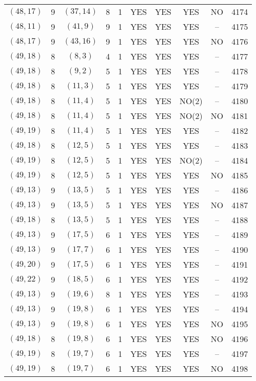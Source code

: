 \begin{longtable}{|c|c|c|c|c|c|c|c|c|c|}
$(48, 17)$ & 9 & $(37, 14)$ & 8 & 1 & YES & YES & YES & NO & 4174\\
$(48, 11)$ & 9 & $(41, 9)$ & 9 & 1 & YES & YES & YES & -- & 4175\\
$(48, 17)$ & 9 & $(43, 16)$ & 9 & 1 & YES & YES & YES & NO & 4176\\
$(49, 18)$ & 8 & $(8, 3)$ & 4 & 1 & YES & YES & YES & -- & 4177\\
$(49, 18)$ & 8 & $(9, 2)$ & 5 & 1 & YES & YES & YES & -- & 4178\\
$(49, 18)$ & 8 & $(11, 3)$ & 5 & 1 & YES & YES & YES & -- & 4179\\
$(49, 18)$ & 8 & $(11, 4)$ & 5 & 1 & YES & YES & NO(2) & -- & 4180\\
$(49, 18)$ & 8 & $(11, 4)$ & 5 & 1 & YES & YES & NO(2) & NO & 4181\\
$(49, 19)$ & 8 & $(11, 4)$ & 5 & 1 & YES & YES & YES & -- & 4182\\
$(49, 18)$ & 8 & $(12, 5)$ & 5 & 1 & YES & YES & YES & -- & 4183\\
$(49, 19)$ & 8 & $(12, 5)$ & 5 & 1 & YES & YES & NO(2) & -- & 4184\\
$(49, 19)$ & 8 & $(12, 5)$ & 5 & 1 & YES & YES & YES & NO & 4185\\
$(49, 13)$ & 9 & $(13, 5)$ & 5 & 1 & YES & YES & YES & -- & 4186\\
$(49, 13)$ & 9 & $(13, 5)$ & 5 & 1 & YES & YES & YES & NO & 4187\\
$(49, 18)$ & 8 & $(13, 5)$ & 5 & 1 & YES & YES & YES & -- & 4188\\
$(49, 13)$ & 9 & $(17, 5)$ & 6 & 1 & YES & YES & YES & -- & 4189\\
$(49, 13)$ & 9 & $(17, 7)$ & 6 & 1 & YES & YES & YES & -- & 4190\\
$(49, 20)$ & 9 & $(17, 5)$ & 6 & 1 & YES & YES & YES & -- & 4191\\
$(49, 22)$ & 9 & $(18, 5)$ & 6 & 1 & YES & YES & YES & -- & 4192\\
$(49, 13)$ & 9 & $(19, 6)$ & 8 & 1 & YES & YES & YES & -- & 4193\\
$(49, 13)$ & 9 & $(19, 8)$ & 6 & 1 & YES & YES & YES & -- & 4194\\
$(49, 13)$ & 9 & $(19, 8)$ & 6 & 1 & YES & YES & YES & NO & 4195\\
$(49, 18)$ & 8 & $(19, 8)$ & 6 & 1 & YES & YES & YES & NO & 4196\\
$(49, 19)$ & 8 & $(19, 7)$ & 6 & 1 & YES & YES & YES & -- & 4197\\
$(49, 19)$ & 8 & $(19, 7)$ & 6 & 1 & YES & YES & YES & NO & 4198\\

\end{longtable}
